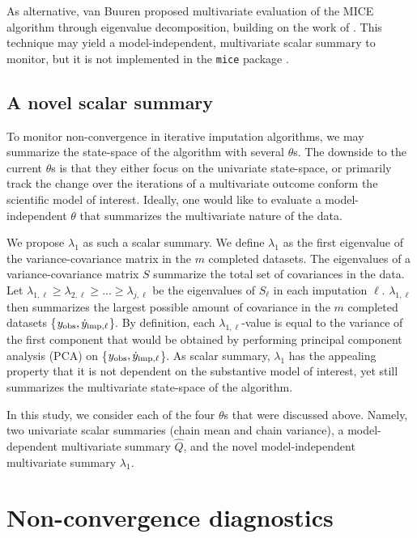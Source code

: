 \documentclass[Royal,times,sageh]{sagej}
\begin{document}
As alternative, van Buuren \citeyearpar[\(\S\) 4.5.2]{buur18} proposed multivariate evaluation of the MICE algorithm through eigenvalue decomposition, building on the work of \citet{mack03}. This technique may yield a model-independent, multivariate scalar summary to monitor, but it is not implemented in the \texttt{mice} package \citep{mice}.

\hypertarget{a-novel-scalar-summary}{%
\subsection{A novel scalar summary}\label{a-novel-scalar-summary}}

To monitor non-convergence in iterative imputation algorithms, we may summarize the state-space of the algorithm with several \(\theta\)s. The downside to the current \(\theta\)s is that they either focus on the univariate state-space, or primarily track the change over the iterations of a multivariate outcome conform the scientific model of interest. Ideally, one would like to evaluate a model-independent \(\theta\) that summarizes the multivariate nature of the data.

We propose \(\lambda_{1}\) as such a scalar summary. We define \(\lambda_{1}\) as the first eigenvalue of the variance-covariance matrix in the \(m\) completed datasets. The eigenvalues of a variance-covariance matrix \(S\) summarize the total set of covariances in the data. Let \(\lambda_{1, \ell} \geq \lambda_{2, \ell} \geq ... \geq \lambda_{j, \ell}\) be the eigenvalues of \(S_\ell\) in each imputation \(\ell\). \(\lambda_{1,\ell}\) then summarizes the largest possible amount of covariance in the \(m\) completed datasets \{\(y_{\rm obs}, \dot y_{\rm imp, \ell}\)\}. By definition, each \(\lambda_{1, \ell}\)-value is equal to the variance of the first component that would be obtained by performing principal component analysis (PCA) on \{\(y_{\rm obs}, \dot y_{\rm imp, \ell}\)\}. As scalar summary, \(\lambda_{1}\) has the appealing property that it is not dependent on the substantive model of interest, yet still summarizes the multivariate state-space of the algorithm.

In this study, we consider each of the four \(\theta\)s that were discussed above. Namely, two univariate scalar summaries (chain mean and chain variance), a model-dependent multivariate summary \(\hat{Q}\), and the novel model-independent multivariate summary \(\lambda_1\).

\hypertarget{non-convergence-diagnostics}{%
\section{Non-convergence diagnostics}\label{non-convergence-diagnostics}}
\end{document}
